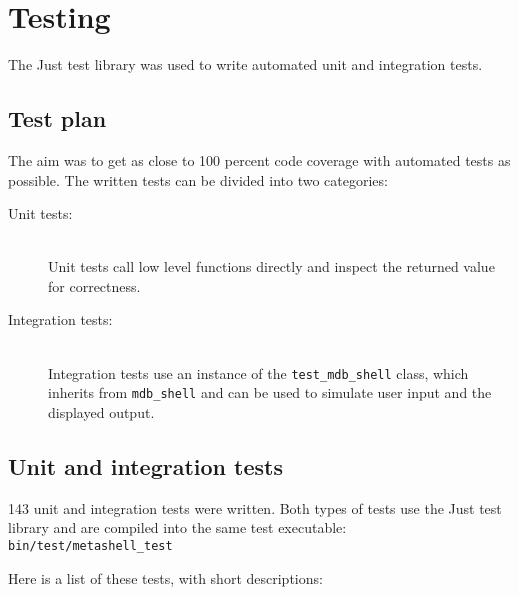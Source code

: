 
\chapter{Testing}

The Just\cite{just} test library was used to write automated unit and
integration tests.


\section{Test plan}


The aim was to get as close to 100 percent code coverage with automated tests
as possible. The written tests can be divided into two categories:

\begin{description}
    \item[Unit tests:] \hfill \\
        Unit tests call low level functions directly and inspect the returned
        value for correctness.
    \item[Integration tests:] \hfill \\
        Integration tests use an instance of the \texttt{test\_mdb\_shell}
        class, which inherits from \texttt{mdb\_shell} and can be used to
        simulate user input and the displayed output.
\end{description}

\section{Unit and integration tests} \label{tests}

143 unit and integration tests were written. Both types of tests use the Just
test library and are compiled into the same test executable:
\verb$bin/test/metashell_test$

Here is a list of these tests, with short descriptions:

